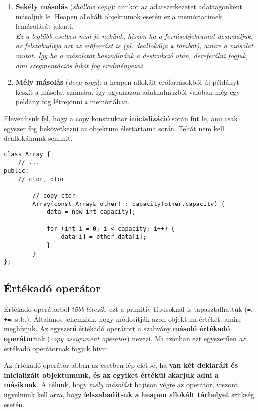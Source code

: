 \documentclass[a4paper, 11pt, oneside]{book}
\begin{document}
\begin{enumerate}
	\item \textbf{Sekély másolás} (\textit{shallow copy}): amikor az adatszerkezetet adattagonként másoljuk le. Heapen allokált objektumok esetén ez a memóriacímek lemásolását jelenti. \\ \textit{Ez a legtöbb esetben nem jó nekünk, hiszen ha a forrásobjektumot destruáljuk, az felszabadítja azt az erőforrást is (pl. deallokálja a tömböt), amire a másolat mutat. Így ha a másolatot használnánk a destrukció után, dereferálni fogjuk, ami szegmentációs hibát fog eredményezni.}
	
	\item \textbf{Mély másolás} (\textit{deep copy}): a heapen allokált erőforrásokból új példányt készít a másolat számára. Így ugyanazon adathalmazból valóban még egy példány fog létrejönni a memóriában.
\end{enumerate}

Elevenítsük fel, hogy a copy konstruktor \textbf{inicializáció} során fut le, ami csak egyszer fog bekövetkezni az objektum élettartama során. Tehát nem kell deallokálnunk semmit.

\begin{lstlisting}[style=cppstyle]
class Array {
	// ... 
public:
	// ctor, dtor
	
		// copy ctor
		Array(const Array& other) : capacity(other.capacity) {
			data = new int[capacity];
			
			for (int i = 0; i < capacity; i++) {
				data[i] = other.data[i];
			}
		}
};
\end{lstlisting}

\subsection{Értékadó operátor}

Értékadó operátorból \textit{több létezik}, ezt a primitív típusoknál is tapasztalhattuk (\verb*|=|, \verb*|+=|, stb.). Általános jellemzőik, hogy módosítják azon objektum értékét, amire meghívjuk. Az egyszerű értékadó operátort a szabvány \textbf{másoló értékadó operátor}nak (\textit{copy assignment operator}) nevezi. Mi azonban ezt egyszerűen \textit{az} értékadó operátornak fogjuk hívni.

Az értékadó operátor abban az esetben lép életbe, ha \textbf{van két deklarált és inicializált objektumunk, és az egyiket értékül akarjuk adni a másiknak}. A célunk, hogy \textit{mély másolás}t hajtson végre az operátor, viszont ügyelnünk kell arra, hogy \textbf{felszabadítsuk a heapen allokált tárhelyet} szükség esetén.
\end{document}
